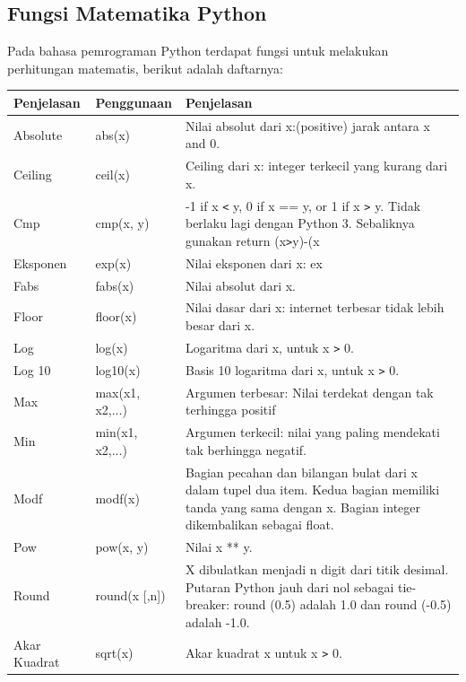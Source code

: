 \subsection{Fungsi Matematika Python}
Pada bahasa pemrograman Python terdapat fungsi untuk melakukan perhitungan matematis, berikut adalah daftarnya:
\begin{center}
\begin{tabular}{ | m{2cm} | m{2cm} | m{5cm} | }
\hline
Penjelasan & Penggunaan & Penjelasan \\
\hline
Absolute & abs(x) & Nilai absolut dari x:(positive) jarak antara x and 0. \\
\hline
Ceiling & ceil(x) & Ceiling dari x: integer terkecil yang kurang dari x. \\
\hline
Cmp & cmp(x, y) & -1 if x \texttt{<} y, 0 if x == y, or 1 if x \texttt{>} y. Tidak berlaku lagi dengan Python 3. Sebaliknya gunakan return (x\texttt{>}y)-(x \\
\hline
Eksponen & exp(x) & Nilai eksponen dari x: ex \\
\hline
Fabs & fabs(x) & Nilai absolut dari x. \\
\hline
Floor & floor(x) & Nilai dasar dari x: internet terbesar tidak lebih besar dari x. \\
\hline
Log & log(x) & Logaritma dari x, untuk x \texttt{>} 0. \\
\hline
Log 10 & log10(x) & Basis 10 logaritma dari x, untuk x \texttt{>} 0. \\
\hline
Max & max(x1, x2,...) & Argumen terbesar: Nilai terdekat dengan tak terhingga positif \\
\hline
Min & min(x1, x2,...) & Argumen terkecil: nilai yang paling mendekati tak berhingga negatif. \\
\hline
Modf & modf(x) & Bagian pecahan dan bilangan bulat dari x dalam tupel dua item. Kedua bagian memiliki tanda yang sama dengan x. Bagian integer dikembalikan sebagai float. \\
\hline
Pow & pow(x, y) & Nilai x ** y. \\
\hline
Round & round(x [,n]) & X dibulatkan menjadi n digit dari titik desimal. Putaran Python jauh dari nol sebagai tie-breaker: round (0.5) adalah 1.0 dan round (-0.5) adalah -1.0. \\
\hline
Akar Kuadrat & sqrt(x) & Akar kuadrat x untuk x \texttt{>} 0. \\
\hline
\end{tabular}
\end{center}


